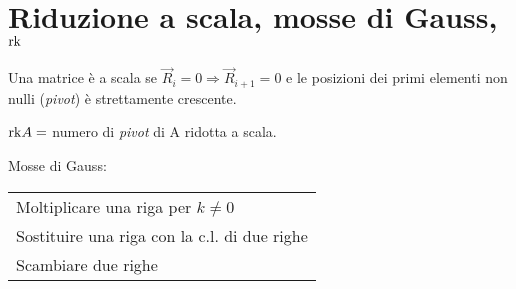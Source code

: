 \section{Riduzione a scala, mosse di Gauss, $\mathrm{rk}$}
Una matrice è a scala se $\vec{R}_i = 0 \Rightarrow \vec{R}_{i+1} = 0$ e le posizioni dei primi elementi non nulli (\emph{pivot})
è strettamente crescente.

$\mathrm{rk} A = $ numero di \emph{pivot} di A ridotta a scala.

Mosse di Gauss:

\begin{tabular}{l}
	Moltiplicare una riga per $k \ne 0$ \\
	Sostituire una riga con la c.l. di due righe \\
	Scambiare due righe \\
\end{tabular}

